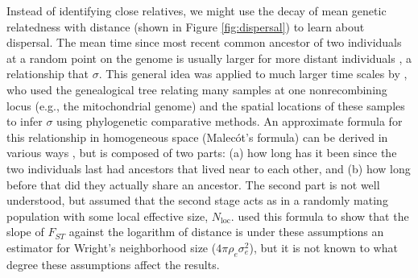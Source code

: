 \documentclass{ar-1col}
\newcommand{\g}[1]{{\color{blue}{#1}}}
\begin{document}
Instead of identifying close relatives,
we might use the decay of mean genetic relatedness with distance 
(shown in Figure \ref{fig:dispersal}) 
to learn about dispersal.
The mean time since most recent common ancestor 
of two individuals at a random point on the genome
is usually larger for more distant individuals \citep{sexton2013genetic,epperson2003geographical,charlesworth2003effects},
a relationship that \g{clearly has something to do with} $\sigma$.
This general idea was applied to much larger time scales by \citep{neigel1991estimation,neigel1993application},
who used the genealogical tree relating many samples at one nonrecombining locus
(e.g., the mitochondrial genome) and the spatial locations of these samples
to infer $\sigma$ using phylogenetic comparative methods.
An approximate formula for this relationship
in homogeneous space (Malec\'ot's formula)
can be derived in various ways 
\citep{malecot, sawyer1976branching, rousset_1997, barton-depaulis-etheridge, robledoarnuncio2010isolation, ringbauer2017inferring, alasadi2018estimating},
but is composed of two parts: 
(a) how long has it been since the two individuals last had ancestors that lived near to each other,
and (b) how long before that did they actually share an ancestor.
The second part is not well understood,
but \citet{malecot} assumed that the second stage acts as in a randomly mating population
with some local effective size, $N_\text{loc}$.
\citet{rousset_1997} used this formula to show that
the slope of $F_{ST}$ against the logarithm of distance
is under these assumptions an estimator for Wright's neighborhood size ($4 \pi \rho_e \sigma_e^2$),
but it is not known to what degree these assumptions affect the results.
\end{document}
